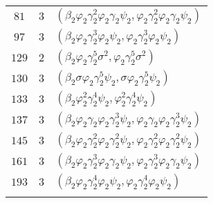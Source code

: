 \begin{supertabular}{|c|c|p{9cm}|}
$81$
&$3$ &$(\beta_2\varphi_2\gamma_2^{2}\varphi_2\gamma_2\psi_2,\varphi_2\gamma_2^{2}\varphi_2\gamma_2\psi_2)$\\
$97$
&$3$ &$(\beta_2\varphi_2\gamma_2^{3}\varphi_2\psi_2,\varphi_2\gamma_2^{3}\varphi_2\psi_2)$\\
$129$
&$2$ &$(\beta_2\varphi_2\gamma_2^{5}\sigma^{2},\varphi_2\gamma_2^{5}\sigma^{2})$\\
$130$
&$3$ &$(\beta_2\sigma\varphi_2\gamma_2^{5}\psi_2,\sigma\varphi_2\gamma_2^{5}\psi_2)$\\
$133$
&$3$ &$(\beta_2\varphi_2^{2}\gamma_2^{4}\psi_2,\varphi_2^{2}\gamma_2^{4}\psi_2)$\\
$137$
&$3$ &$(\beta_2\varphi_2\gamma_2\varphi_2\gamma_2^{3}\psi_2,\varphi_2\gamma_2\varphi_2\gamma_2^{3}\psi_2)$\\
$145$
&$3$ &$(\beta_2\varphi_2\gamma_2^{2}\varphi_2\gamma_2^{2}\psi_2,\varphi_2\gamma_2^{2}\varphi_2\gamma_2^{2}\psi_2)$\\
$161$
&$3$ &$(\beta_2\varphi_2\gamma_2^{3}\varphi_2\gamma_2\psi_2,\varphi_2\gamma_2^{3}\varphi_2\gamma_2\psi_2)$\\
$193$
&$3$ &$(\beta_2\varphi_2\gamma_2^{4}\varphi_2\psi_2,\varphi_2\gamma_2^{4}\varphi_2\psi_2)$\\
&&\\\end{supertabular}
